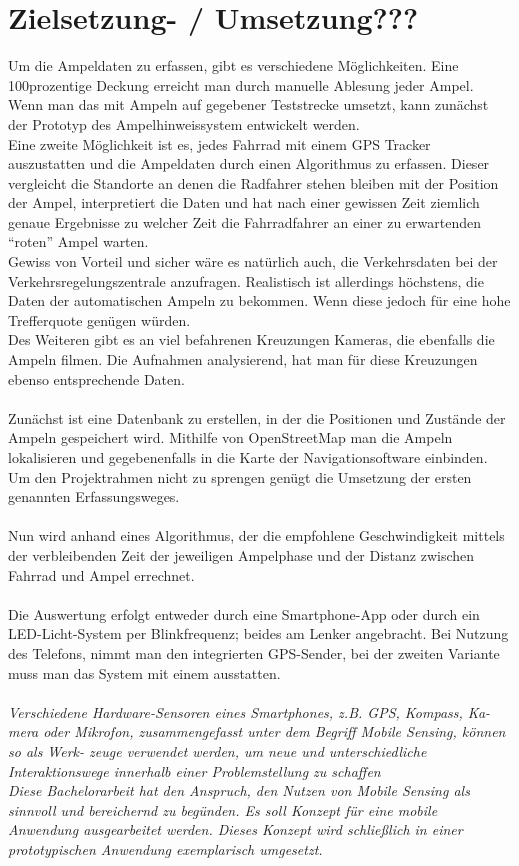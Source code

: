 \section{Zielsetzung- / Umsetzung???}
Um die Ampeldaten zu erfassen, gibt es verschiedene Möglichkeiten. 
Eine 100prozentige Deckung erreicht man durch manuelle Ablesung jeder Ampel. Wenn man das mit Ampeln auf gegebener Teststrecke umsetzt, kann zunächst der Prototyp des Ampelhinweissystem entwickelt werden. \\
Eine zweite Möglichkeit ist es, jedes Fahrrad mit einem GPS Tracker auszustatten und die Ampeldaten durch einen Algorithmus zu erfassen. Dieser vergleicht die Standorte an denen die Radfahrer stehen bleiben mit der Position der Ampel, interpretiert die Daten und hat nach einer gewissen Zeit ziemlich genaue Ergebnisse zu welcher Zeit die Fahrradfahrer an einer zu erwartenden “roten” Ampel warten.\\
Gewiss von Vorteil und sicher wäre es natürlich auch, die Verkehrsdaten bei der Verkehrsregelungszentrale anzufragen. Realistisch ist allerdings höchstens, die Daten der automatischen Ampeln zu bekommen. Wenn diese jedoch für eine hohe Trefferquote genügen würden.\\
Des Weiteren gibt es an viel befahrenen Kreuzungen Kameras, die ebenfalls die Ampeln filmen. Die Aufnahmen analysierend, hat man für diese Kreuzungen ebenso entsprechende Daten.\\\\
Zunächst ist eine Datenbank zu erstellen, in der die Positionen und Zustände der Ampeln gespeichert wird. Mithilfe von OpenStreetMap man die Ampeln lokalisieren und gegebenenfalls in die Karte der Navigationsoftware einbinden. Um den Projektrahmen nicht zu sprengen genügt die Umsetzung der ersten genannten Erfassungsweges.\\\\
Nun wird anhand eines Algorithmus, der die empfohlene Geschwindigkeit mittels der verbleibenden Zeit der jeweiligen Ampelphase und der Distanz zwischen Fahrrad und Ampel errechnet.\\\\
Die Auswertung erfolgt entweder durch eine Smartphone-App oder durch ein LED-Licht-System per Blinkfrequenz; beides am Lenker angebracht. Bei Nutzung des Telefons, nimmt man den integrierten GPS-Sender, bei der zweiten Variante muss man das System mit einem ausstatten.
\\\\
\textit{Verschiedene Hardware-Sensoren eines Smartphones, z.B. GPS, Kompass, Ka-
mera oder Mikrofon, zusammengefasst unter dem Begriff Mobile Sensing, können so als Werk-
zeuge verwendet werden, um neue und unterschiedliche Interaktionswege innerhalb einer
Problemstellung zu schaffen \\ Diese Bachelorarbeit hat den Anspruch, den Nutzen von Mobile Sensing als sinnvoll und bereichernd zu begünden. Es soll Konzept für eine mobile Anwendung ausgearbeitet werden. Dieses Konzept wird schließlich in einer prototypischen Anwendung exemplarisch umgesetzt.}
